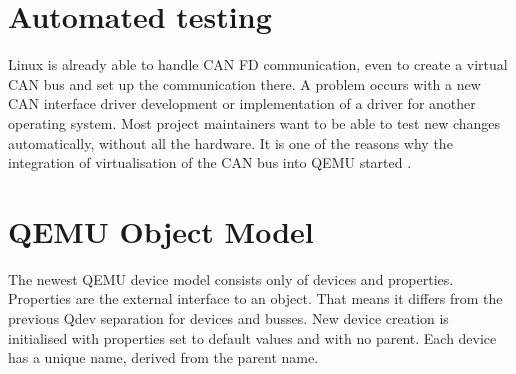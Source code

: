 \documentclass{ctuthesis}
\begin{document}
 \section{Automated testing}
 Linux is already able to handle CAN FD communication, even to create a virtual CAN bus and set up the communication there. A problem occurs with a new CAN interface driver development or implementation of a driver for another operating system. Most project maintainers want to be able to test new changes automatically, without all the hardware. It is one of the reasons why the integration of virtualisation of the CAN bus into QEMU started \cite{qemu_development}.

 \section{QEMU Object Model}
  The newest QEMU device model consists only of devices and properties\cite{qemu_qom}. Properties are the external interface to an object. That means it differs from the previous Qdev separation for devices and busses. New device creation is initialised with properties set to default values and with no parent. Each device has a unique name, derived from the parent name.
\end{document}
